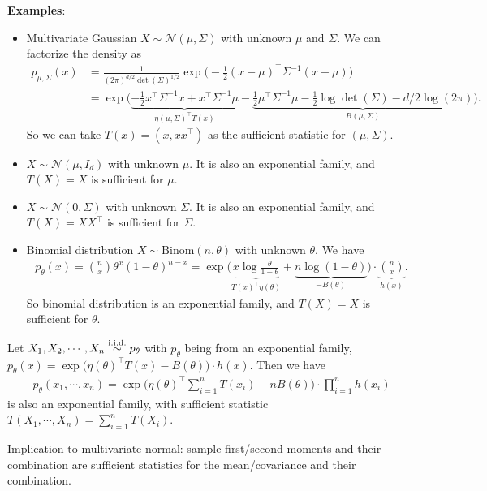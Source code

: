 \documentclass[11pt,letterpaper]{article}
\numberwithin{theorem}{lecture}
\numberwithin{proposition}{lecture}
\numberwithin{lemma}{lecture}
\numberwithin{claim}{lecture}
\numberwithin{corollary}{lecture}
\numberwithin{definition}{lecture}
\numberwithin{conjecture}{lecture}
\numberwithin{remark}{lecture}
\numberwithin{example}{lecture}
\numberwithin{equation}{lecture}
\begin{document}
\bigskip
\noindent \textbf{Examples}:
\begin{itemize}
  \item Multivariate Gaussian $X \sim \mathcal{N} (\mu, \Sigma)$ with unknown $\mu$ and $\Sigma$. We can factorize the density as
  \begin{align*}
    p_{\mu, \Sigma} (x) &= \frac{1}{(2\pi)^{d/2} \det(\Sigma)^{1/2}} \exp \Big( -\frac{1}{2} (x - \mu)^\top \Sigma^{-1} (x - \mu) \Big)\\
    &= \exp \Big( \underbrace{-\frac{1}{2} x^\top \Sigma^{-1} x + x^\top \Sigma^{-1} \mu}_{\eta(\mu, \Sigma)^\top T(x)} - \underbrace{\frac{1}{2} \mu^\top \Sigma^{-1} \mu - \frac{1}{2} \log\det(\Sigma) - d/2\log(2\pi)}_{B(\mu, \Sigma)} \Big).
  \end{align*}
  So we can take $T(x) = (x, xx^\top)$ as the sufficient statistic for $(\mu, \Sigma)$.
  \item $X \sim \mathcal{N} (\mu, I_d)$ with unknown $\mu$. It is also an exponential family, and $T(X) = X$ is sufficient for $\mu$.
  \item $X \sim \mathcal{N} (0, \Sigma)$ with unknown $\Sigma$. It is also an exponential family, and $T(X) = XX^\top$ is sufficient for $\Sigma$.
  \item Binomial distribution $X \sim \mathrm{Binom} (n, \theta)$ with unknown $\theta$. We have
  \begin{align*}
    p_\theta (x) = \binom{n}{x} \theta^x (1 - \theta)^{n - x} = \exp \Big(\underbrace{ x \log \frac{\theta}{1 - \theta}}_{T (x)^\top \eta (\theta)} + \underbrace{n \log (1 - \theta) }_{- B (\theta)}\Big) \cdot \underbrace{\binom{n}{x}}_{h (x)}.
  \end{align*}
  So binomial distribution is an exponential family, and $T(X) = X$ is sufficient for $\theta$.
\end{itemize}
\begin{proposition}
  Let $X_1, X_2, \cdots, X_n \overset{\mathrm{i.i.d.}}{\sim} p_\theta$ with $p_\theta$ being from an exponential family, $p_\theta (x) = \exp \big( \eta (\theta)^\top T (x) - B (\theta) \big) \cdot h (x)$. Then we have
  \begin{align*}
    p_\theta (x_1, \cdots, x_n) = \exp \Big( \eta (\theta)^\top \sum_{i=1}^n T (x_i) - n B (\theta) \Big) \cdot \prod_{i=1}^n h (x_i)
  \end{align*}
  is also an exponential family, with sufficient statistic $T(X_1, \cdots, X_n) = \sum_{i=1}^n T (X_i)$.
\end{proposition}
Implication to multivariate normal: sample first/second moments and their combination are sufficient statistics for the mean/covariance and their combination.
\end{document}
